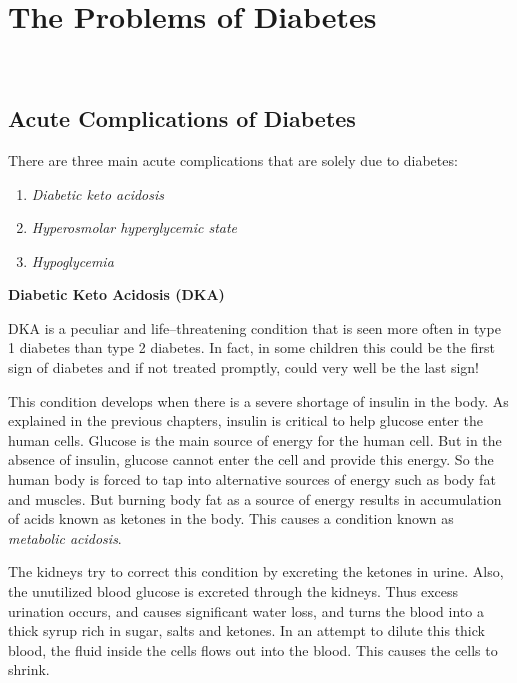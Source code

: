 
\part{The Problems of Diabetes}

\newpage
~\phantom{a}
\thispagestyle{empty}
\newpage

\chapter{Acute Complications of Diabetes}\label{chap10}

There are three main acute complications that are solely due to diabetes:

\begin{enumerate}
\itemsep=0pt
\item \textit{Diabetic keto acidosis}
\item \textit{Hyperosmolar hyperglycemic state}
\item \textit{Hypoglycemia}
\end{enumerate}
 
\noindent\textbf{Diabetic Keto Acidosis (DKA)}

DKA is a peculiar and life–threatening condition that is seen more often in type 1 diabetes than type 2 diabetes. In fact, in some children this could be the first sign of diabetes and if not treated promptly, could very well be the last sign!

This condition develops when there is a severe shortage of insulin in the body. As explained in the previous chapters, insulin is critical to help glucose enter the human cells. Glucose is the main source of energy for the human cell. But in the absence of insulin, glucose cannot enter the cell and provide this energy. So the human body is forced to tap into alternative sources of energy such as body fat and muscles. But burning body fat as a source of energy results in accumulation of acids known as ketones in the body. This causes a condition known as \textit{metabolic acidosis}.

The kidneys try to correct this condition by excreting the ketones in urine. Also, the unutilized blood glucose is excreted through the kidneys. Thus excess urination occurs, and causes significant water loss, and turns the blood into a thick syrup rich in sugar, salts and ketones. In an attempt to dilute this thick blood, the fluid inside the cells flows out into the blood. This causes the cells to shrink.

